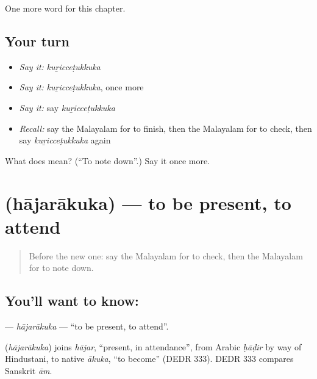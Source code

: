 \begin{grammarlens}[title={What you've built}]
One more word for this chapter.
\end{grammarlens}

\subsection*{Your turn}
\begin{itemize}
\raggedright
  \item \emph{Say it:} \emph{kuṟicceṭukkuka}
  \item \emph{Say it:} \emph{kuṟicceṭukkuka}, once more
  \item \emph{Say it:} say \emph{kuṟicceṭukkuka}
  \item \emph{Recall:} say the Malayalam for to finish, then the Malayalam for to check, then say \emph{kuṟicceṭukkuka} again
\end{itemize}

\begin{tcolorbox}[breakable,colback=teal!4,colframe=teal!35!black,title={Before you move on}]
What does  mean? (\textquotedblleft{}To note down\textquotedblright{}.) Say it once more.
\end{tcolorbox}
\section[\texorpdfstring{\ml{ഹാജരാകുക} (hājarākuka)}{ഹാജരാകുക (hājarākuka)}]{ (hājarākuka) — to be present, to attend}

\label{lesson:ML-C227-hajarakuka}



\begin{quote}
Before the new one: say the Malayalam for to check, then the Malayalam for to note down.
\end{quote}

\subsection*{You'll want to know: }
\textbf{} — \emph{hājarākuka} — \textquotedblleft{}to be present, to attend\textquotedblright{}.

\begin{cousinweb}
\textbf{} (\emph{hājarākuka}) joins \emph{hājar}, \textquotedblleft{}present, in attendance\textquotedblright{}, from Arabic \emph{ḥāḍir} by way of Hindustani, to native \emph{ākuka}, \textquotedblleft{}to become\textquotedblright{} (DEDR 333). DEDR 333 compares Sanskrit \emph{ām}.
\end{cousinweb}

